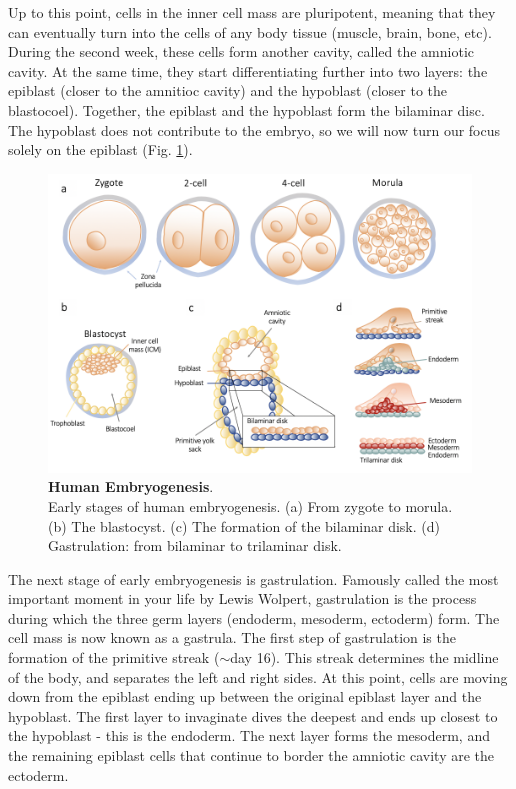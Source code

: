 Up to this point, cells in the inner cell mass are pluripotent, meaning that they can eventually turn into the cells of any body tissue (muscle, brain, bone, etc). 
During the second week, these cells form another cavity, called the amniotic cavity. 
At the same time, they start differentiating further into two layers: the epiblast (closer to the amnitioc cavity) and the hypoblast (closer to the blastocoel). 
Together, the epiblast and the hypoblast form the bilaminar disc.
The hypoblast does not contribute to the embryo, so we will now turn our focus solely on the epiblast (Fig. \ref{fig:embryogenesis}).\\

\begin{figure}[h]
\centering
\includegraphics[width=14.5cm]{Chapter1/Fig/embryogenesis_til_gastrulation.png}
\caption[Human Embryogenesis]{\textbf{Human Embryogenesis}.\\
Early stages of human embryogenesis.
(a) From zygote to morula.
(b) The blastocyst.
(c) The formation of the bilaminar disk.
(d) Gastrulation: from bilaminar to trilaminar disk.}
\label{fig:embryogenesis}
\end{figure}

The next stage of early embryogenesis is gastrulation.
Famously called the most important moment in your life by Lewis Wolpert, gastrulation is the process during which the three germ layers (endoderm, mesoderm, ectoderm) form.
The cell mass is now known as a gastrula.
The first step of gastrulation is the formation of the primitive streak ($\sim$day 16).
This streak determines the midline of the body, and separates the left and right sides.
At this point, cells are moving down from the epiblast ending up between the original epiblast layer and the hypoblast.
The first layer to invaginate dives the deepest and ends up closest to the hypoblast - this is the endoderm.
The next layer forms the mesoderm, and the remaining epiblast cells that continue to border the amniotic cavity are the ectoderm.\\

